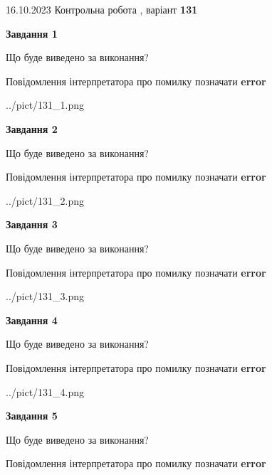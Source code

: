 \documentclass[12pt, ukrainian]{article}
\begin{document}
{\Large{16.10.2023 Контрольна робота , варіант  \No \textbf { 131 }\par}}
{
\begin {large}
{\begin {center}\textbf{Завдання 1}\end {center}}\par
Що буде виведено за виконання? \par
Повідомлення інтерпретатора про помилку позначати \textbf{error}

\begin{center}
	{../pict/131_1.png}
\end{center}
\newpage

{\begin {center}\textbf{Завдання 2}\end {center}}\par
Що буде виведено за виконання? \par
Повідомлення інтерпретатора про помилку позначати \textbf{error}

\begin{center}
	{../pict/131_2.png}
\end{center}
\newpage

{\begin {center}\textbf{Завдання 3}\end {center}}\par
Що буде виведено за виконання? \par
Повідомлення інтерпретатора про помилку позначати \textbf{error}

\begin{center}
	{../pict/131_3.png}
\end{center}
\newpage

{\begin {center}\textbf{Завдання 4}\end {center}}\par
Що буде виведено за виконання? \par
Повідомлення інтерпретатора про помилку позначати \textbf{error}

\begin{center}
	{../pict/131_4.png}
\end{center}
\newpage

{\begin {center}\textbf{Завдання 5}\end {center}}\par
Що буде виведено за виконання? \par
Повідомлення інтерпретатора про помилку позначати \textbf{error}


\end{large}}
\end{document}
